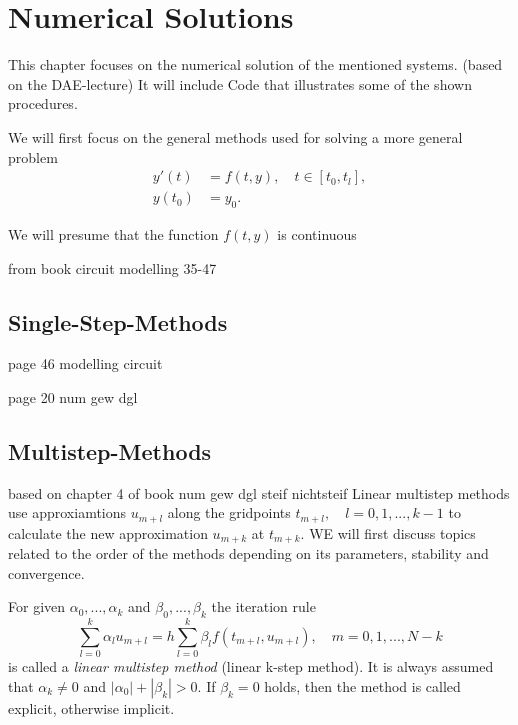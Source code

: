 \chapter{Numerical Solutions}
This chapter focuses on the numerical solution of the mentioned systems. (based on the DAE-lecture)
It will include Code that illustrates some of the shown procedures.

We will first focus on the general methods used for solving a more general problem
\begin{align}
	\label{general numerical problem}
	y'(t) &= f(t,y), \quad t \in [t_0, t_l], \\
	y(t_0) &= y_0.
\end{align}


We will presume that the function $f(t,y)$ is continuous 


from book circuit modelling 35-47

\section{Single-Step-Methods}
page 46 modelling circuit

page 20 num gew dgl
\section{Multistep-Methods}
based on chapter 4 of book num gew dgl steif nichtsteif \newline
Linear multistep methods use approxiamtions $u_{m+l}$ along the gridpoints $t_{m+l}, \quad l=0,1,...,k-1$ to calculate the new approximation $u_{m+k}$ at $t_{m+k}$. WE will first discuss topics related to the order of the methods depending on its parameters, stability and convergence.

\begin{definition}
	For given $\alpha_0, ..., \alpha_k$ and $\beta_0, ..., \beta_k$ the iteration rule
	\begin{equation}
		\label{linear-multistep-method}
		\sum_{l=0}^{k} \alpha_l u_{m+l} = h \sum_{l=0}^{k} \beta_l f(t_{m+l}, u_{m+l}), \quad m=0,1,...,N-k
	\end{equation}
	is called a \emph{linear multistep method} (linear k-step method). It is always assumed that $\alpha_k \neq 0$ and $|\alpha_0| + |\beta_k| > 0$. If $\beta_k=0$ holds, then the method is called explicit, otherwise implicit.
\end{definition}

